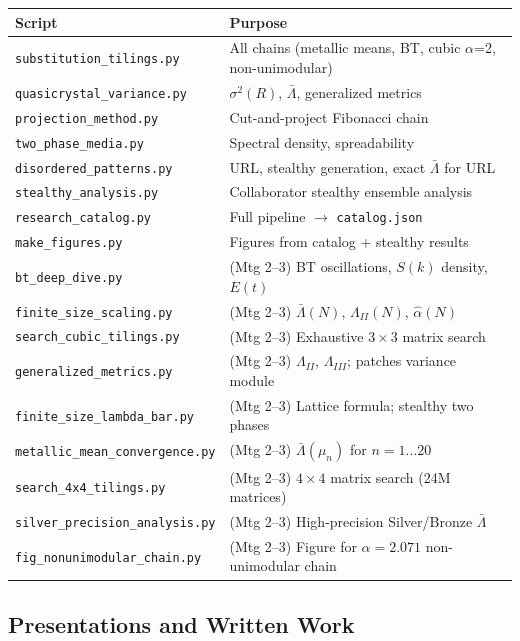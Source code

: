 \documentclass[11pt,letterpaper]{article}
\begin{document}
\noindent\begin{tabular}{ll}
\toprule
\textbf{Script} & \textbf{Purpose} \\
\midrule
\texttt{substitution\_tilings.py}     & All chains (metallic means, BT, cubic $\alpha$=2, non-unimodular) \\
\texttt{quasicrystal\_variance.py}    & $\sigma^2(R)$, $\bar\Lambda$, generalized metrics \\
\texttt{projection\_method.py}        & Cut-and-project Fibonacci chain \\
\texttt{two\_phase\_media.py}         & Spectral density, spreadability \\
\texttt{disordered\_patterns.py}      & URL, stealthy generation, exact $\bar\Lambda$ for URL \\
\texttt{stealthy\_analysis.py}        & Collaborator stealthy ensemble analysis \\
\texttt{research\_catalog.py}         & Full pipeline $\to$ \texttt{catalog.json} \\
\texttt{make\_figures.py}             & Figures from catalog + stealthy results \\
\midrule
\texttt{bt\_deep\_dive.py}            & (Mtg 2--3) BT oscillations, $S(k)$ density, $E(t)$ \\
\texttt{finite\_size\_scaling.py}     & (Mtg 2--3) $\bar\Lambda(N)$, $\Lambda_{II}(N)$, $\hat\alpha(N)$ \\
\texttt{search\_cubic\_tilings.py}    & (Mtg 2--3) Exhaustive $3\times3$ matrix search \\
\texttt{generalized\_metrics.py}      & (Mtg 2--3) $\Lambda_{II}$, $\Lambda_{III}$; patches variance module \\
\texttt{finite\_size\_lambda\_bar.py} & (Mtg 2--3) Lattice formula; stealthy two phases \\
\texttt{metallic\_mean\_convergence.py} & (Mtg 2--3) $\bar\Lambda(\mu_n)$ for $n=1\ldots20$ \\
\texttt{search\_4x4\_tilings.py}      & (Mtg 2--3) $4\times4$ matrix search (24M matrices) \\
\texttt{silver\_precision\_analysis.py} & (Mtg 2--3) High-precision Silver/Bronze $\bar\Lambda$ \\
\texttt{fig\_nonunimodular\_chain.py} & (Mtg 2--3) Figure for $\alpha=2.071$ non-unimodular chain \\
\bottomrule
\end{tabular}

\subsection*{Presentations and Written Work}
\end{document}
